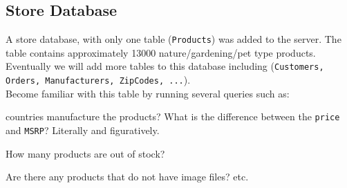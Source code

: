 \documentclass{article}
\begin{document}
\subsection*{Store Database}
A store database, with only one table (\texttt{Products}) was added to the server.    The table contains approximately 13000 nature/gardening/pet type products. Eventually we will add more tables to this database including (\texttt{Customers,
Orders, Manufacturers, ZipCodes, ...}).  \\

\noindent  Become familiar with this table by running several queries such as:
\begin{outline}[enumerate]
        \1  countries manufacture the products?
        \1 What is the difference between the \texttt{price} and \texttt{MSRP}?  Literally and figuratively.
 
 \1 How many products are out of stock?
 
 \1 Are there any products that do not have image files?
 \1 etc.
\end{outline}
  
  



 
\end{document}
